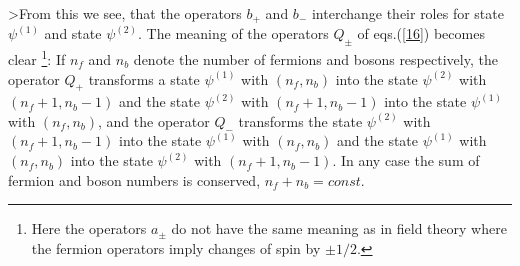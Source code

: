 \documentclass[a4paper,12pt,a4]{article}
\begin{document}
>From this we see, that the operators $b_+$
and $b_-$ interchange their roles
for  state $\psi^{(1)}$
and  state $\psi^{(2)}$.
The meaning of the operators $Q_{\pm}$
of eqs.(\ref{16}) becomes
clear \footnote{Here the operators
$a_{\pm}$ do not have the same meaning as in field
theory where the fermion operators
imply changes of spin by $\pm 1/2$.}:
If $n_f$ and $n_b$ denote the number of fermions
 and
bosons respectively,
the operator $Q_+$ transforms a state $\psi^{(1)}$
with $(n_f, n_b)$ into the state
$\psi^{(2)}$ with $(n_f+1, n_b-1)$
and the state $\psi^{(2)}$ with
$(n_f+1, n_b-1)$ into the state
$\psi^{(1)}$ with $(n_f, n_b)$, and
the operator $Q_-$ transforms the state
$\psi^{(2)}$ with $(n_f+1, n_b-1)$ into the state $\psi^{(1)}$
with $(n_f, n_b)$ and the state $\psi^{(1)}$ with
$(n_f, n_b)$ into the state $\psi^{(2)}$
with $(n_f+1, n_b-1)$.  In any case the sum
of fermion and boson numbers is conserved, $n_f+n_b=const.$
\end{document}
